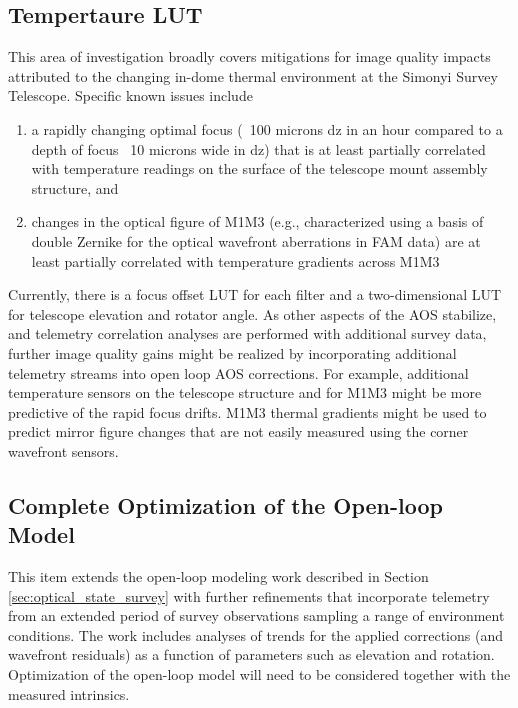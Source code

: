 \documentclass[SO,lsst,authoryear,toc]{lsstdoc}
\begin{document}
\subsection{Tempertaure LUT}
\label{sec:temp_lut}

This area of investigation broadly covers mitigations for image quality impacts attributed to the changing in-dome thermal environment at the Simonyi Survey Telescope. Specific known issues include
\begin{enumerate}
  \item a rapidly changing optimal focus (~100 microns dz in an hour compared to a depth of focus ~10 microns wide in dz) that is at least partially correlated with temperature readings on the surface of the telescope mount assembly structure, and
  \item changes in the optical figure of M1M3 (e.g., characterized using a basis of double Zernike for the optical wavefront aberrations in FAM data) are at least partially correlated with temperature gradients across M1M3
\end{enumerate}

Currently, there is a focus offset LUT for each filter and a two-dimensional LUT for telescope elevation and rotator angle. As other aspects of the AOS stabilize, and telemetry correlation analyses are performed with additional survey data, further image quality gains might be realized by incorporating additional telemetry streams into open loop AOS corrections.
For example, additional temperature sensors on the telescope structure and for M1M3 might be more predictive of the rapid focus drifts.
M1M3 thermal gradients might be used to predict mirror figure changes that are not easily measured using the corner wavefront sensors.

\subsection{Complete Optimization of the Open-loop Model}
\label{sec:open_loop_optimization}

This item extends the open-loop modeling work described in Section \ref{sec:optical_state_survey} with further refinements that incorporate telemetry from an extended period of survey observations sampling a range of environment conditions.
The work includes analyses of trends for the applied corrections (and wavefront residuals) as a function of parameters such as elevation and rotation.
Optimization of the open-loop model will need to be considered together with the measured intrinsics.
\end{document}
